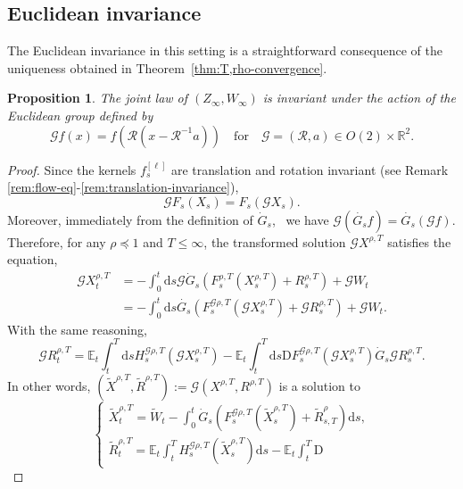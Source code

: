 \documentclass[11pt, a4paper]{scrartcl}
\numberwithin{equation}{section}
\theoremstyle{plain}
\newtheorem{proposition}[foo]{Proposition}
\theoremstyle{remark}
\newcommand{\assign}{:=}
\newcommand{\mathD}{\mathrm{D}}
\newcommand{\mathd}{\mathrm{d}}
\begin{document}
\subsection{Euclidean invariance}

The Euclidean invariance in this setting is a straightforward consequence of
the uniqueness obtained in Theorem~\ref{thm:T,rho-convergence}.

\begin{proposition}
	The joint law of $(Z_{\infty}, W_{\infty})$ is invariant under the action of
	the Euclidean group defined by
	\[ \mathcal{G} f (x) = f (\mathcal{R} (x - \mathcal{R}^{- 1} a))  \quad
		\text{for} \quad \mathcal{G} = (\mathcal{R}, a) \in O (2) \times
		\mathbb{R}^2 . \]
\end{proposition}

\begin{proof}
	Since the kernels $f^{[\ell]}_s$ are translation and rotation invariant (see
	Remark \ref{rem:flow-eq}-\ref{rem:translation-invariance}),
	\[ \mathcal{G} F_s (X_s) = F_s (\mathcal{G} X_s) . \]
	Moreover, immediately from the definition of $\dot{G}_s$, \ we have
	$\mathcal{G} (\dot{G_s} f) = \dot{G_s} (\mathcal{G} f)$. Therefore, for any
	$\rho \preceq  1$ and $T \leqslant \infty$, the transformed solution
	$\mathcal{G} X^{\rho, T}$ satisfies the equation,
	\begin{align*}
		\mathcal{G} X_t^{\rho, T} & = - \int_0^t \mathd s \mathcal{G}  \dot{G}_s
		(F^{\rho, T}_s (X_s^{\rho, T}) + R_s^{\rho, T}) + \mathcal{G} W_t        \\
		                          & = -
		\int_0^t \mathd s \dot{G_s} (F^{\mathcal{G} \rho, T}_s (\mathcal{G}
		X_s^{\rho, T}) + \mathcal{G} R_s^{\rho, T}) + \mathcal{G} W_t .
	\end{align*}
	With the same reasoning,
	\[ \mathcal{G} R_t^{\rho, T} =\mathbb{E}_t  \int_t^T \mathd s H^{\mathcal{G}
				\rho, T}_s (\mathcal{G} X_s^{\rho, T}) -\mathbb{E}_t  \int_t^T \mathd s
		\mathD F^{\mathcal{G} \rho, T}_s (\mathcal{G} X_s^{\rho, T})  \dot{G}_s
		\mathcal{G} R_s^{\rho, T} . \]
	In other words, $(\tilde{X}^{\rho, T}, \tilde{R}^{\rho, T}) \assign
		\mathcal{G} (X^{\rho, T}, R^{\rho, T})$ is a solution to
	\[ \begin{cases}
			\tilde{X}^{\rho, T}_t = \tilde{W}_t - \int_0^t \dot{G}_s
			(F^{\mathcal{G} \rho, T}_s (\tilde{X}^{\rho, T}_s) + \tilde{R}_{s,
			T}^{\rho}) \mathd s, \\
			\tilde{R}_t^{\rho, T} =\mathbb{E}_t  \int_t^T H^{\mathcal{G} \rho, T}_s
			(\tilde{X}_s^{\rho, T}) \mathd s -\mathbb{E}_t  \int_t^T \mathD

\end{cases}\]
\end{proof}
\end{document}
